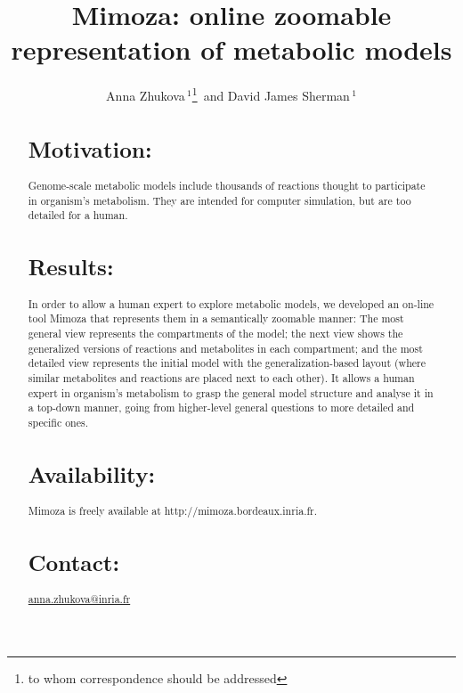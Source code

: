 \documentclass{bioinfo}
\begin{document}

\title[Mimoza]{Mimoza: online zoomable representation of metabolic models}
\author[Zhukova \textit{et~al}]{Anna Zhukova\,$^{1}$\footnote{to whom correspondence should be addressed}\, and David James Sherman\,$^{1}$}
\address{$^{1}$Inria/Universit\'e Bordeaux/CNRS joint project-team MAGNOME, 351, cours de la Lib\'{e}ration, F-33405 Talence, France.}



\maketitle

\begin{abstract}

\section{Motivation:}
Genome-scale metabolic models include thousands of reactions thought to participate in organism's metabolism. They are intended for computer simulation, but are too detailed for a human. 

\section{Results:}
In order to allow a human expert to explore metabolic models, we developed an on-line tool Mimoza that represents them in a semantically zoomable manner: The most general view represents the compartments of the model; the next view shows the generalized versions of reactions and metabolites in each compartment; and the most detailed view represents the initial model with the generalization-based layout (where similar metabolites and reactions are placed next to each other). It allows a human expert in organism's metabolism to grasp the general model structure and analyse it in a top-down manner, going from higher-level general questions to more detailed and specific ones.

\section{Availability:}
Mimoza is freely available at http://mimoza.bordeaux.inria.fr.

\section{Contact:} \href{Anna Zhukova}{anna.zhukova@inria.fr}
\end{abstract}
\end{document}
